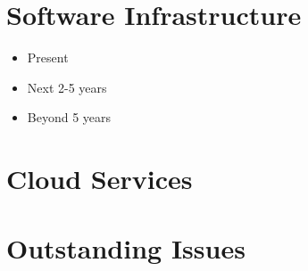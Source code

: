 \documentclass[10pt,a4paper]{report}
\begin{document}
\section{Software Infrastructure}
\begin{itemize}
\item Present
\item Next 2-5 years
\item Beyond 5 years
\end{itemize}

\section{Cloud Services}

\section{Outstanding Issues}
\end{document}
